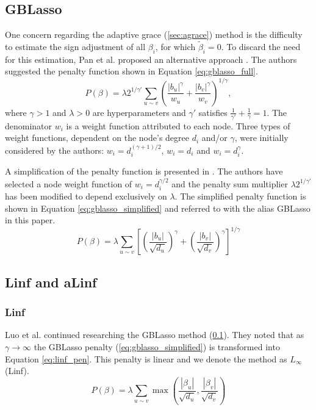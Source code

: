 \subsection{GBLasso} \label{sec:gblasso}
One concern regarding the adaptive grace (\ref{sec:agrace}) method is the difficulty to estimate the sign adjustment of all $\beta_i$, for which $\tilde{\beta}_i = 0$. To discard the need for this estimation, Pan et al. proposed an alternative approach \cite{pan2010incorporating}. The authors suggested the penalty function shown in Equation \ref{eq:gblasso_full}. 
\begin{equation} \label{eq:gblasso_full}
P(\beta) = \lambda 2^{1/\gamma'}\sum_{u \sim v}\left(\frac{|b_u|^\gamma}{w_u}+\frac{|b_v|^\gamma}{w_v}\right)^{1/\gamma},
\end{equation}
where $\gamma > 1$ and $\lambda > 0$ are hyperparameters and $\gamma'$ satisfies $\frac{1}{\gamma'}+\frac{1}{\gamma}=1$. The denominator $w_i$ is a weight function attributed to each node. Three types of weight functions, dependent on the node's degree $d_i$ and/or $\gamma$, were initially considered by the authors: $w_i = d_i^{(\gamma+1)/2}$, $w_i = d_i$ and $w_i = d_i^\gamma$. 

A simplification of the penalty function is presented in \cite{luo2012two}. The authors have selected a node weight function of $w_i = d_i^{\gamma/2}$ and the penalty sum multiplier $\lambda2^{1/\gamma'}$ has been modified to depend exclusively on $\lambda$. The simplified penalty function is shown in Equation \ref{eq:gblasso_simplified} and referred to with the alias GBLasso in this paper.
\begin{equation} \label{eq:gblasso_simplified}
P(\beta) = \lambda\sum_{u \sim v}
\left[\left(\frac{|b_u|}{\sqrt{d_u}}\right)^\gamma+
\left(\frac{|b_v|}{\sqrt{d_v}}\right)^\gamma\right]^{1/\gamma}
\end{equation}



\subsection{Linf and aLinf}

\subsubsection{Linf}
Luo et al. \cite{luo2012two} continued researching the GBLasso method (\ref{sec:gblasso}). They noted that as $\gamma\rightarrow\infty$ the GBLasso penalty (\ref{eq:gblasso_simplified}) is transformed into Equation \ref{eq:linf_pen}. This penalty is linear and we denote the method as $L_\infty$ (Linf). 
\begin{equation} \label{eq:linf_pen}
P(\beta) = \lambda\sum_{u \sim v}\max\left(\frac{|\beta_u|}{\sqrt{d_u}},\frac{|\beta_v|}{\sqrt{d_v}}\right)
\end{equation}

